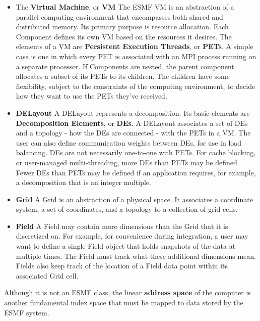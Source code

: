 \begin{itemize}

\item The {\bf Virtual Machine}, or {\bf VM} The ESMF VM is an 
abstraction of a parallel computing environment that encompasses 
both shared and distributed memory.  Its primary purpose 
is resource allocation.  Each Component defines its own VM based on 
the resources it desires.  The elements of a VM are {\bf Persistent 
Execution Threads}, or {\bf PETs}.  A simple case is one in which 
every PET is associated with an MPI process running on a separate
processor.  If Components are nested, the parent component allocates 
a subset of its PETs to its children.  The children have some flexibility, 
subject to the constraints of the computing environment, to decide 
how they want to use the PETs they've received.

\item {\bf DELayout}  A DELayout represents a decomposition.  Its
basic elements are {\bf Decomposition Elements}, or {\bf DEs}.  
A DELayout associates a set of DEs and a topology - how the DEs 
are connected - with the PETs in a VM.  The user can also define 
communication weights between DEs, for use in load balancing.
DEs are not necessarily one-to-one with PETs.  For cache blocking,
or user-managed multi-threading, more DEs than PETs may be defined.
Fewer DEs than PETs may be defined if an application requires,
for example, a decomposition that is an integer multiple.

\item {\bf Grid}  A Grid is an abstraction of a physical space.  
It associates a coordinate system, a set of coordinates, and 
a topology to a collection of grid cells. 

\item {\bf Field}  A Field may contain more dimensions than the 
Grid that it is discretized on.  For example, for convenience 
during integration, a user may want to define a single Field object 
that holds snapshots of the data at multiple times.  The Field 
must track what these additional dimensions mean.  Fields also 
keep track of the location of a Field data point within its 
associated Grid cell.

\end{itemize}

Although it is not an ESMF class, the linear {\bf address space} 
of the computer is another fundamental index space that must be 
mapped to data stored by the ESMF system.  

